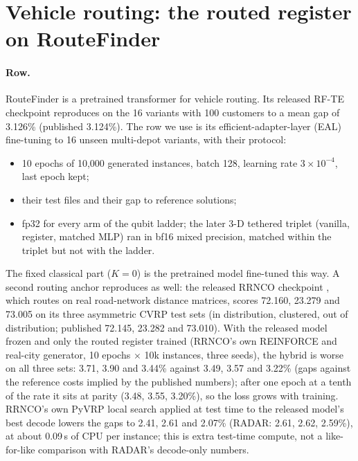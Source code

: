 \documentclass{article}
\begin{document}
\section{Vehicle routing: the routed register on RouteFinder}
\label{app:routing}
\paragraph{Row.} RouteFinder \citep{berto2025routefinder} is a pretrained transformer for vehicle routing. Its released
RF-TE checkpoint reproduces on the 16 variants with 100 customers to a mean gap of 3.126\% (published 3.124\%). The row
we use is its efficient-adapter-layer (EAL) fine-tuning to 16 unseen multi-depot variants, with their protocol:
\begin{itemize}
  \item 10 epochs of 10,000 generated instances, batch 128, learning rate $3{\times}10^{-4}$, last epoch kept;
  \item their test files and their gap to reference solutions;
  \item fp32 for every arm of the qubit ladder; the later 3-D tethered triplet (vanilla, register, matched MLP) ran in
    bf16 mixed precision, matched within the triplet but not with the ladder.
\end{itemize}
The fixed classical part ($K=0$) is the pretrained model fine-tuned this way.
A second routing anchor reproduces as well: the released RRNCO checkpoint \citep{son2026rrnco}, which routes on real
road-network distance matrices, scores 72.160, 23.279 and 73.005 on its three asymmetric CVRP test sets (in distribution,
clustered, out of distribution; published 72.145, 23.282 and 73.010). With the released model frozen and only the routed register trained (RRNCO's own
REINFORCE and real-city generator, 10 epochs $\times$ 10k instances, three seeds), the hybrid is worse on all three sets:
3.71, 3.90 and 3.44\% against 3.49, 3.57 and 3.22\% (gaps against the reference costs implied by the published numbers);
after one epoch at a tenth of the rate it sits at parity (3.48, 3.55, 3.20\%), so the loss grows with training. RRNCO's own PyVRP local search applied at test time to the released model's best
decode lowers the gaps to 2.41, 2.61 and 2.07\% (RADAR: 2.61, 2.62, 2.59\%), at about 0.09\,s of CPU per instance; this
is extra test-time compute, not a like-for-like comparison with RADAR's decode-only numbers.
\end{document}
